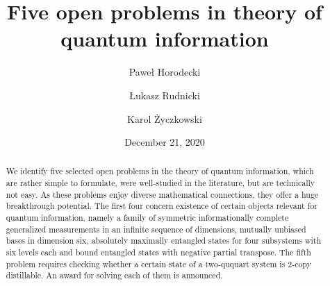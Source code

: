 \documentclass[english,aps,pra,nofootinbib,twocolumn,superscriptaddress]{revtex4-1}
\newcommand{\1}{{\rm 1\hspace{-0.9mm}l}}
\begin{document}
\title{Five open problems in theory of quantum information}


\author{Pawe\l{} Horodecki}




\author{\L{}ukasz Rudnicki}





\author{Karol \.{Z}yczkowski}




 \date{December 21, 2020}

\begin{abstract}

We identify five selected open problems in the theory of quantum information, which
are rather simple to formulate,  were well-studied in the literature, but are technically not easy.
As these problems enjoy diverse mathematical connections,
they offer a huge breakthrough potential.
The first four concern existence of certain objects relevant for 
quantum information, namely 
a family of symmetric informationally complete generalized measurements
in an infinite sequence of dimensions,  mutually unbiased bases in dimension six, 
absolutely maximally entangled states for four subsystems with six levels each and bound entangled states with negative partial transpose. 
The fifth problem requires checking whether a certain state of  a two-ququart system is $2$-copy distillable.
 An award for solving each of them is announced.

\end{abstract}
\end{document}
